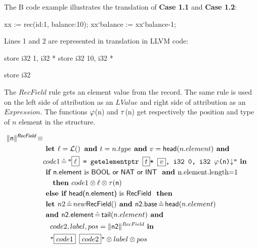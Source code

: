 \documentclass{llncs}
\newcommand{\trad}[2]{\ensuremath{\lVert \textsf{#1} \rVert^{\textit{#2}}}}
\newcommand{\nl}[0]{\ensuremath{\downarrow}}
\DeclareMathOperator{\isdef}{\equiv}
\DeclareMathOperator{\lbl}{\mathcal{L}()}
\newcommand{\llvm}[1]{\texttt{#1}}
\newcommand{\B}[1]{\textsf{#1}}
\newcommand{\IF}[0]{\textbf{ if }}
\newcommand{\ELSIF}[0]{\textbf{ else if }}
\newcommand{\THEN}[0]{\textbf{ then }}
\newcommand{\LET}[0]{\textbf{ let }}
\DeclareMathOperator{\BE}{\hat{=}}
\newcommand{\IN}[0]{\textbf{ in }}
\newcommand{\AND}[0]{\textbf{ and }}
\newcommand{\PH}[1]{\framebox{$#1$}}
\newcommand{\sep}[0]{\otimes}
\newcommand{\SBPos}[0]{\ensuremath{\sf\varphi}}
\newcommand{\SBType}[0]{\ensuremath{\sf\tau}}
\begin{document}
The B code example illustrates the translation of \textbf{Case 1.1} and \textbf{Case 1.2}:

\begin{pascalcode}
xx := rec(id:1, balance:10);
xx`balance := xx`balance-1;
\end{pascalcode}

Lines 1 and 2 are represented in translation in LLVM code:

\begin{llvmcode}
store i32 1, i32 * %
store i32 10, i32 * %

store i32 %
\end{llvmcode}

The $RecField$ rule gets an element value from the record. The same rule is 
used on the left side of attribution as an $LValue$ and right side of 
attribution as an $Expression$. The functions \SBPos(n) and \SBType(n)  get 
respectively the position and type of $n$ element in the structure. 

\begin{align*}
\begin{split}
  \trad{n}{\B{RecField}} \isdef \\
   &\LET \ell = \lbl  \AND  t = n.type \AND v = \B{head}(n.element) \AND\\
   &code1 \BE \llvm{"\PH{\ell} = getelementptr \PH{t}* \PH{v}, i32 0, i32  \SBPos(\B{n})\nl"} \IN \\
   &\IF \B{n.element} \mbox{ is \B{BOOL or NAT or INT} \AND n.element.length=1}\\
   &\quad \THEN  code1 \sep  \ell  \sep \SBType(\B{n})\\
   &\ELSIF \B{head(n.element)} \mbox{ is \B{RecField} }  \THEN \\
   &\LET n2 \BE new \B{RecField}() \AND  \B{n2.base}  \BE \B{head}(n.element)\\
   &\AND \B{n2.element} \BE \B{tail}(n.element) \AND \\
   &\quad code2, label, pos = \trad{n2}{RecField} \IN\\
   &\quad \llvm{"\PH{code1} \PH{code2}"} \sep  label  \sep pos \\
\end{split}
\end{align*}
\end{document}

